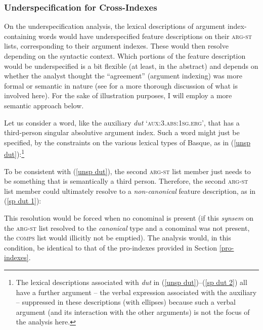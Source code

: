 \documentclass[output=paper
	        ,collection
	        ,collectionchapter
 	        ,biblatex
                ,babelshorthands
                ,newtxmath
                ,draftmode
                ,colorlinks, citecolor=brown
]{langscibook}
\begin{document}
\subsubsection{Underspecification for Cross-Indexes}

On the underspecification analysis, the lexical descriptions of argument index-containing words would have underspecified feature descriptions on their \textsc{arg-st} lists, corresponding to their argument indexes. These would then resolve depending on the syntactic context. Which portions of the feature description would be underspecified is a bit flexible (at least, in the abstract) and depends on whether the analyst thought the ``agreement'' (argument indexing) was more formal or semantic in nature (see  for a more thorough discussion of what is involved here). For the sake of illustration purposes, I will employ a more semantic approach below.

Let us consider a word, like the  auxiliary \textit{dut} `\textsc{aux:3.abs:1sg.erg}', that has a third-person singular absolutive argument index. Such a word might just be specified, by the constraints on the various lexical types of Basque, as in (\ref{unsp dut}):\footnote{The lexical descriptions associated with \textit{dut} in (\ref{unsp dut})--(\ref{sp dut 2}) all have a further argument -- the verbal expression associated with the auxiliary -- suppressed in these descriptions (with ellipses) because such a verbal argument (and its interaction with the other arguments) is not the focus of the analysis here.}
%
\begin{exe}
\ex\label{unsp dut}
\end{exe}
%
To be consistent with (\ref{unsp dut}), the second \textsc{arg-st} list member just needs to be something that is semantically a third person. Therefore, the second \textsc{arg-st} list member could ultimately resolve to a \textit{non-canonical} feature description, as in (\ref{sp dut 1}): 
%
\begin{exe}
\ex\label{sp dut 1}
\end{exe}
%
This resolution would be forced when no conominal is present (if this \textit{synsem} on the \textsc{arg-st} list resolved to the \textit{canonical} type and a conominal was not present, the \textsc{comps} list would illicitly not be emptied). The analysis would, in this condition, be identical to that of the pro-indexes provided in Section \ref{pro-indexes}.
\end{document}

